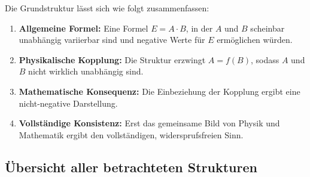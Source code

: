 ﻿\documentclass[12pt, a4paper]{article}
\begin{document}
	Die Grundstruktur lässt sich wie folgt zusammenfassen:
	\begin{enumerate}
		\item \textbf{Allgemeine Formel:} Eine Formel $E = A \cdot B$, in der $A$ und $B$ scheinbar unabhängig variierbar sind und negative Werte für $E$ ermöglichen würden.
		\item \textbf{Physikalische Kopplung:} Die Struktur erzwingt $A = f(B)$, sodass $A$ und $B$ nicht wirklich unabhängig sind.
		\item \textbf{Mathematische Konsequenz:} Die Einbeziehung der Kopplung ergibt eine nicht-negative Darstellung.
		\item \textbf{Vollständige Konsistenz:} Erst das gemeinsame Bild von Physik und Mathematik ergibt den vollständigen, widersprufsfreien Sinn.
	\end{enumerate}
	
	\subsection{Übersicht aller betrachteten Strukturen}
	
\end{document}

